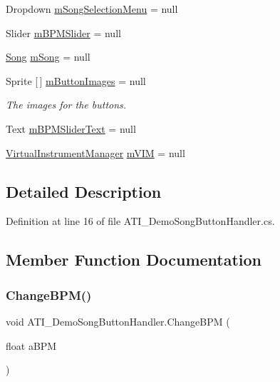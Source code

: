 \begin{DoxyCompactItemize}
Dropdown \hyperlink{class_a_t_i___demo_song_button_handler_af58c5b6dd392fbf606b74188b02044ce}{m\+Song\+Selection\+Menu} = null
\item 
Slider \hyperlink{class_a_t_i___demo_song_button_handler_a7d1ed48ed81d7fc9fbde52f8ee87600e}{m\+B\+P\+M\+Slider} = null
\item 
\hyperlink{class_song}{Song} \hyperlink{class_a_t_i___demo_song_button_handler_aef782d481c6250a9062162c71298ed8f}{m\+Song} = null
\item 
Sprite \mbox{[}$\,$\mbox{]} \hyperlink{class_a_t_i___demo_song_button_handler_a9d62cca93ee54ba52e0c7de5f30d9490}{m\+Button\+Images} = null
\begin{DoxyCompactList}\small\item\em The images for the buttons. \end{DoxyCompactList}\item 
Text \hyperlink{class_a_t_i___demo_song_button_handler_af884aa63036769a78f92d86084156263}{m\+B\+P\+M\+Slider\+Text} = null
\item 
\hyperlink{class_virtual_instrument_manager}{Virtual\+Instrument\+Manager} \hyperlink{class_a_t_i___demo_song_button_handler_ac078f283ce74a7b310ebb2cbbc55f70b}{m\+V\+IM} = null
\end{DoxyCompactItemize}


\subsection{Detailed Description}


Definition at line 16 of file A\+T\+I\+\_\+\+Demo\+Song\+Button\+Handler.\+cs.



\subsection{Member Function Documentation}
\mbox{\label{class_a_t_i___demo_song_button_handler_a9a7fc268b3021a826dc4ad031a856dfc}} 
\subsubsection{\texorpdfstring{Change\+B\+P\+M()}{ChangeBPM()}}
{\footnotesize\ttfamily void A\+T\+I\+\_\+\+Demo\+Song\+Button\+Handler.\+Change\+B\+PM (\begin{DoxyParamCaption}\item[{float}]{a\+B\+PM }\end{DoxyParamCaption})}



